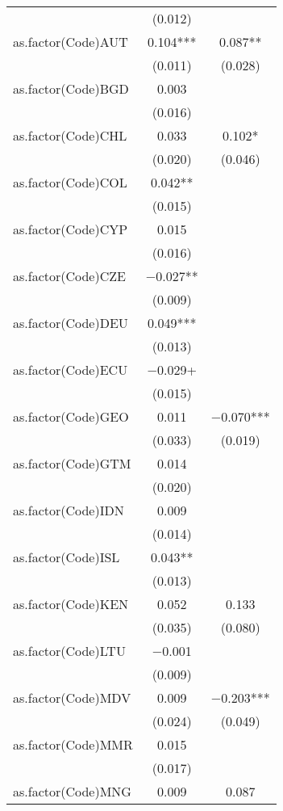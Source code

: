 \documentclass{MSword}
\begin{document}
\begin{table}
\begin{tabular}[t]{lcc}
 & (\num{0.012}) & \\
as.factor(Code)AUT & \num{0.104}*** & \num{0.087}**\\
 & (\num{0.011}) & (\num{0.028})\\
as.factor(Code)BGD & \num{0.003} & \\
 & (\num{0.016}) \vphantom{1} & \\
as.factor(Code)CHL & \num{0.033} & \num{0.102}*\\
 & (\num{0.020}) & (\num{0.046})\\
as.factor(Code)COL & \num{0.042}** & \\
 & (\num{0.015}) \vphantom{1} & \\
as.factor(Code)CYP & \num{0.015} & \\
 & (\num{0.016}) & \\
as.factor(Code)CZE & \num{-0.027}** & \\
 & (\num{0.009}) \vphantom{1} & \\
as.factor(Code)DEU & \num{0.049}*** & \\
 & (\num{0.013}) \vphantom{1} & \\
as.factor(Code)ECU & \num{-0.029}+ & \\
 & (\num{0.015}) & \\
as.factor(Code)GEO & \num{0.011} & \num{-0.070}***\\
 & (\num{0.033}) & (\num{0.019})\\
as.factor(Code)GTM & \num{0.014} & \\
 & (\num{0.020}) & \\
as.factor(Code)IDN & \num{0.009} & \\
 & (\num{0.014}) \vphantom{1} & \\
as.factor(Code)ISL & \num{0.043}** & \\
 & (\num{0.013}) & \\
as.factor(Code)KEN & \num{0.052} & \num{0.133}\\
 & (\num{0.035}) & (\num{0.080})\\
as.factor(Code)LTU & \num{-0.001} & \\
 & (\num{0.009}) & \\
as.factor(Code)MDV & \num{0.009} & \num{-0.203}***\\
 & (\num{0.024}) & (\num{0.049})\\
as.factor(Code)MMR & \num{0.015} & \\
 & (\num{0.017}) & \\
as.factor(Code)MNG & \num{0.009} & \num{0.087}\\

\end{tabular}
\end{table}
\end{document}
